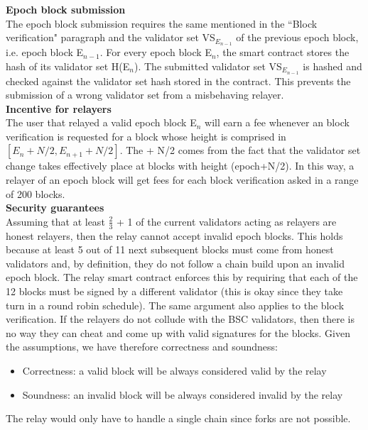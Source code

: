 \noindent
\textbf{Epoch block submission}\\
The epoch block submission requires the same \rlph mentioned in the ``Block verification" paragraph and the validator set VS$_{E_{n-1}}$ of the previous epoch block, i.e. epoch block E$_{n-1}$. For every epoch block E$_{n}$, the smart contract stores the hash of its validator set H(E$_{n}$). The submitted validator set VS$_{E_{n-1}}$ is hashed and checked against the validator set hash stored in the contract. This prevents the submission of a wrong validator set from a misbehaving relayer.\\ %


\noindent
\textbf{Incentive for relayers}\\
The user that relayed a valid epoch block E$_n$ will earn a fee whenever an block verification is requested for a block whose height is comprised in $[E_n + N/2, E_{n+1} + N/2]$. The + N/2 comes from the fact that the validator set change takes effectively place at blocks with height (epoch+N/2). In this way, a relayer of an epoch block will get fees for each block verification asked in a range of 200 blocks.\\


\noindent
\textbf{Security guarantees}\\
Assuming that at least $\frac{2}{3}$ + 1 of the current validators acting as relayers are honest relayers, then the relay cannot accept invalid epoch blocks. This holds because at least 5 out of 11 next subsequent blocks must come from honest validators and, by definition, they do not follow a chain build upon an invalid epoch block. The relay smart contract enforces this by requiring that each of the 12 blocks must be signed by a different validator (this is okay since they take turn in a round robin schedule). The same argument also applies to the block verification. If the relayers do not collude with the BSC validators, then there is no way they can cheat and come up with valid signatures for the blocks. Given the assumptions, we have therefore correctness and soundness:
\begin{itemize}
    \item Correctness: a valid block will be always considered valid by the relay
    \item Soundness: an invalid block will be always considered invalid by the relay
\end{itemize}
The relay would only have to handle a single chain since forks are not possible.\\  

